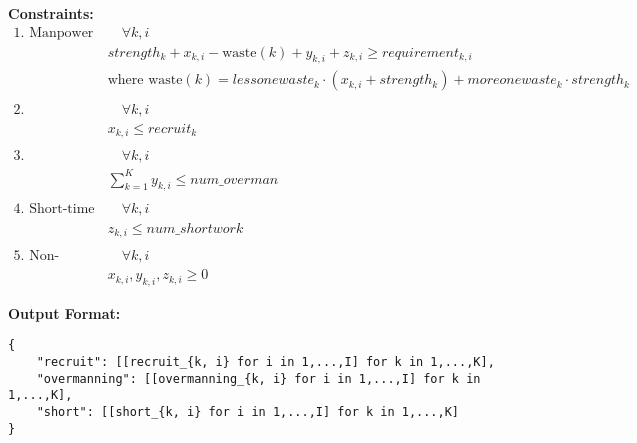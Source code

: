 \documentclass{article}
\begin{document}
\textbf{Constraints:}
\begin{align*}
\text{1. Manpower balance:} & \quad \forall k, i \\
& strength_k + x_{k,i} - \text{waste}(k) + y_{k,i} + z_{k,i} \geq requirement_{k,i} \\
& \text{where waste}(k) = lessonewaste_k \cdot (x_{k,i} + strength_k) + moreonewaste_k \cdot strength_k \\
\\
\text{2. Recruitment limits:} & \quad \forall k, i \\
& x_{k,i} \leq recruit_k \\
\\
\text{3. Overmanning limits:} & \quad \forall k, i \\
& \sum_{k=1}^{K} y_{k,i} \leq num\_overman \\
\\
\text{4. Short-time working limits:} & \quad \forall k, i \\
& z_{k,i} \leq num\_shortwork \\
\\
\text{5. Non-negativity:} & \quad \forall k,i \\
& x_{k,i}, y_{k,i}, z_{k,i} \geq 0
\end{align*}

\textbf{Output Format:}
\begin{verbatim}
{
    "recruit": [[recruit_{k, i} for i in 1,...,I] for k in 1,...,K],
    "overmanning": [[overmanning_{k, i} for i in 1,...,I] for k in 1,...,K],
    "short": [[short_{k, i} for i in 1,...,I] for k in 1,...,K]
}
\end{verbatim}
\end{document}

